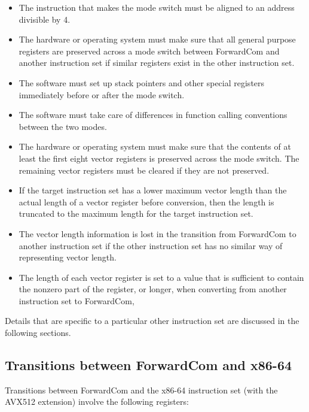 \documentclass[forwardcom.tex]{subfiles}
\begin{document}
\begin{itemize}
\item The instruction that makes the mode switch must be aligned to an address divisible by 4.

\item The hardware or operating system must make sure that all general purpose registers are preserved across a mode switch between ForwardCom and another instruction set if similar registers exist in the other instruction set.

\item The software must set up stack pointers and other special registers immediately before or after the mode switch.

\item The software must take care of differences in function calling conventions between the two modes.

\item The hardware or operating system must make sure that the contents of at least the first eight vector registers is preserved across the mode switch. The remaining vector registers must be cleared if they are not preserved.

\item If the target instruction set has a lower maximum vector length than the actual length of a vector register before conversion, then the length is truncated to the maximum length for the target instruction set.

\item The vector length information is lost in the transition from ForwardCom to another instruction set if the other instruction set has no similar way of representing vector length.

\item The length of each vector register is set to a value that is sufficient to contain the nonzero part of the register, or longer, when converting from another instruction set to ForwardCom, 

\end{itemize}

Details that are specific to a particular other instruction set are discussed in the following sections.

\subsection{Transitions between ForwardCom and x86-64}
Transitions between ForwardCom and the x86-64 instruction set (with the AVX512 extension) involve the following registers:
\end{document}
